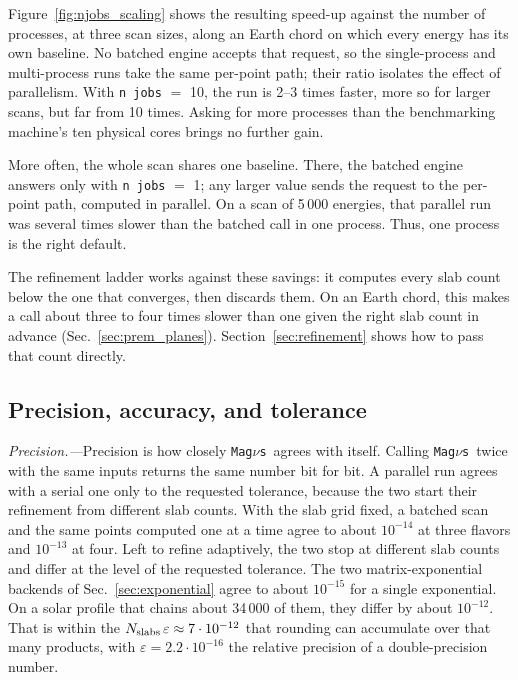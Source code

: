 \documentclass[final,5p,times,twocolumn,sort,compress]{elsarticle}
\makeatletter
\DeclareRobustCommand{\_}{%
  \ifmmode\nfss@text{\textunderscore}\else\textunderscore\allowbreak\fi}
\newcommand{\magnus}{{\tt Mag}\ensuremath{\nu}{\tt s}}
\makeatother
\begin{document}
\begin{enumerate}
Figure~\ref{fig:njobs_scaling} shows the resulting speed-up against the number of processes, at three scan sizes, along an Earth chord on which every energy has its own baseline. No batched engine accepts that request, so the single-process and multi-process runs take the same per-point path; their ratio isolates the effect of parallelism. With {\tt n\_jobs} $=$ 10, the run is 2--3 times faster, more so for larger scans, but far from 10 times. Asking for more processes than the benchmarking machine's ten physical cores brings no further gain.

More often, the whole scan shares one baseline. There, the batched engine answers only with {\tt n\_jobs} $=$ 1; any larger value sends the request to the per-point path, computed in parallel. On a scan of 5\,000 energies, that parallel run was several times slower than the batched call in one process. Thus, one process is the right default.
\end{enumerate}

The refinement ladder works against these savings: it computes every slab count below the one that converges, then discards them. On an Earth chord, this makes a call about three to four times slower than one given the right slab count in advance (Sec.~\ref{sec:prem_planes}). Section~\ref{sec:refinement} shows how to pass that count directly.


\subsection{Precision, accuracy, and tolerance}
\label{sec:diagnostics}

\textit{Precision.---}Precision is how closely \magnus\ agrees with itself. Calling \magnus\ twice with the same inputs returns the same number bit for bit. A parallel run agrees with a serial one only to the requested tolerance, because the two start their refinement from different slab counts. With the slab grid fixed, a batched scan and the same points computed one at a time agree to about $10^{-14}$ at three flavors and $10^{-13}$ at four. Left to refine adaptively, the two stop at different slab counts and differ at the level of the requested tolerance. The two matrix-exponential backends of Sec.~\ref{sec:exponential} agree to about $10^{-15}$ for a single exponential. On a solar profile that chains about 34\,000 of them, they differ by about $10^{-12}$. That is within the $N_{\rm slabs}\,\varepsilon \approx 7 \cdot 10^{-12}$ that rounding can accumulate over that many products, with $\varepsilon = 2.2 \cdot 10^{-16}$ the relative precision of a double-precision number.
\end{document}
